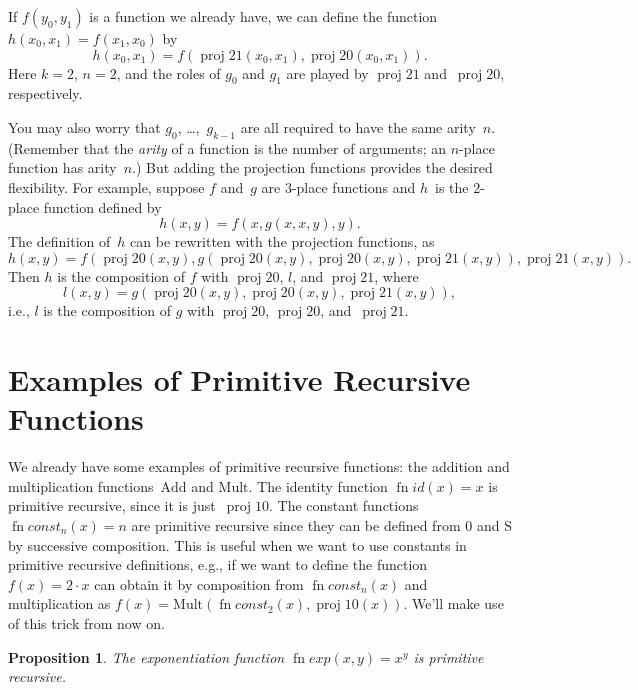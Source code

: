 \documentclass[10pt,a4paper]{article}
\theoremstyle{plain}
\newtheorem{prop}[thm]{Proposition}
\theoremstyle{definition}
\theoremstyle{remark}
\newcommand*{\olfileid}[3]{}
\newcommand*{\olsection}[1]{\section*{#1}}
\providecommand{\Mult}{\ensuremath{\mathrm{Mult}}}
\providecommand{\Add}{\ensuremath{\mathrm{Add}}}
\providecommand{\Zero}{\ensuremath{0}}
\providecommand{\Succ}{\ensuremath{\mathrm{S}}}
\providecommand{\Proj}{\operatorname{proj}}
\providecommand{\fn}{\operatorname{fn}}
\begin{document}
If $f(y_0, y_1)$ is a function we already have, we can define the
function $h(x_0, x_1) = f(x_1, x_0)$ by
\[
h(x_0, x_1) = f(\Proj{2}{1}(x_0, x_1),\Proj{2}{0}(x_0, x_1)).
\]
Here $k=2$, $n = 2$, and the roles of $g_0$ and $g_1$ are played by
$\Proj{2}{1}$ and~$\Proj{2}{0}$, respectively.

You may also worry that $g_0$, \dots,~$g_{k-1}$ are all required
to have the same arity~$n$. (Remember that the \emph{arity} of a
function is the number of arguments; an $n$-place function has
arity~$n$.) But adding the projection functions provides the desired
flexibility. For example, suppose $f$ and~$g$ are $3$-place functions
and $h$~is the $2$-place function defined by
\[
h(x,y) = f(x,g(x,x,y),y).
\]
The definition of~$h$ can be rewritten with the projection
functions, as
\[
h(x,y) = f(\Proj{2}{0}(x,y), g(\Proj{2}{0}(x,y), \Proj{2}{0}(x,y),
\Proj{2}{1}(x,y)), \Proj{2}{1}(x,y)).
\]
Then $h$ is the composition of $f$ with $\Proj{2}{0}$, $l$, and
$\Proj{2}{1}$, where
\[
l(x,y) = g(\Proj{2}{0}(x,y),\Proj{2}{0}(x,y),\Proj{2}{1}(x,y)),
\]
i.e., $l$ is the composition of $g$ with $\Proj{2}{0}$, $\Proj{2}{0}$,
and~$\Proj{2}{1}$.





\olfileid{cmp}{rec}{exa}
\olsection{Examples of Primitive Recursive Functions}


We already have some examples of primitive recursive functions: the
addition and multiplication functions~$\Add$ and $\Mult$.  The
identity function $\fn{id}(x) = x$ is primitive recursive, since it is
just~$\Proj{1}{0}$. The constant functions $\fn{const}_n(x) = n$ are
primitive recursive since they can be defined from $\Zero$ and $\Succ$
by successive composition. This is useful when we want to use
constants in primitive recursive definitions, e.g., if we want to
define the function $f(x) = 2 \cdot x$ can obtain it by composition
from $\fn{const}_n(x)$ and multiplication as $f(x) =
\Mult(\fn{const}_2(x), \Proj{1}{0}(x))$. We'll make use of this trick
from now on.

\begin{prop}
  The exponentiation function $\fn{exp}(x, y) = x^y$ is primitive recursive.
\end{prop}
\end{document}
